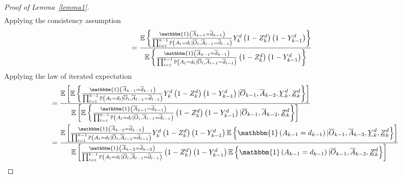 \documentclass[12pt]{article}
\begin{document}
\begin{proof}[Proof of Lemma~\ref{lemma1}]
\begin{align}
\end{align}
Applying the consistency assumption
\begin{align*}
&=\frac{\mathbb{E} \left\lbrace \frac{\mathbbm{1} \left( \overline{A}_{k-1} = \overline{d}_{k-1} \right)}{\prod_{l=1}^{k-1}  \mathbb{P} \left(A_l = d_l \vert \overline{O}_l, \overline{A}_{l-1} = \overline{d}_{l-1} \right)} Y_{k}^d \left(1-Z_{k}^d \right) \left(1-Y_{k-1}^d \right) \right\rbrace}{\mathbb{E} \left\lbrace \frac{\mathbbm{1} \left( \overline{A}_{k-1} = \overline{d}_{k-1} \right)}{\prod_{l=1}^{k-1}  \mathbb{P} \left(A_l = d_l \vert\overline{O}_l, \overline{A}_{l-1} = \overline{d}_{l-1} \right)} \left(1-Z_{k}^d \right) \left(1-Y_{k-1}^d \right) \right\rbrace}
\end{align*}
Applying the law of iterated expectation
\begin{align*}
&=\frac{\mathbb{E} \left[ \mathbb{E} \left\lbrace \frac{\mathbbm{1} \left( \overline{A}_{k-1} = \overline{d}_{k-1} \right)}{\prod_{l=1}^{k-1}  \mathbb{P} \left(A_l = d_l \vert \overline{O}_l, \overline{A}_{l-1} = \overline{d}_{l-1} \right)} Y_{k}^d \left(1-Z_{k}^d \right) \left(1-Y_{k-1}^d \right) \vert  \overline{O}_{k-1}, \overline{A}_{k-2}, \underline{Y}_{k}^d, \underline{Z}_{k}^d \right\rbrace \right]}{\mathbb{E} \left[ \mathbb{E} \left\lbrace \frac{\mathbbm{1} \left( \overline{A}_{k-1} = \overline{d}_{k-1} \right)}{\prod_{l=1}^{k-1}  \mathbb{P} \left(A_l = d_l \vert \overline{O}_l, \overline{A}_{l-1} = \overline{d}_{l-1} \right)} \left(1-Z_{k}^d \right) \left(1-Y_{k-1}^d \right) \vert  \overline{O}_{k-1}, \overline{A}_{k-2}, \underline{Z}_{k}^d \right\rbrace \right]} \\
&=\frac{\mathbb{E} \left[ \frac{\mathbbm{1} \left( \overline{A}_{k-2} = \overline{d}_{k-2} \right) }{\prod_{l=1}^{k-1}  \mathbb{P} \left(A_l = d_l \vert \overline{O}_l, \overline{A}_{l-1} = \overline{d}_{l-1} \right)} Y_{k}^d \left(1-Z_{k}^d \right) \left(1-Y_{k-1}^d \right) \mathbb{E} \left\lbrace \mathbbm{1} \left( A_{k-1} = d_{k-1} \right) \vert  \overline{O}_{k-1}, \overline{A}_{k-2}, \underline{Y}_{k}^d, \underline{Z}_{k}^d \right\rbrace \right]}{\mathbb{E} \left[ \frac{\mathbbm{1} \left( \overline{A}_{k-2} = \overline{d}_{k-2} \right)}{\prod_{l=1}^{k-1}  \mathbb{P} \left(A_l = d_l \vert \overline{O}_l, \overline{A}_{l-1} = \overline{d}_{l-1} \right)} \left(1-Z_{k}^d \right) \left(1-Y_{k-1}^d \right) \mathbb{E} \left\lbrace \mathbbm{1} \left( A_{k-1} = d_{k-1} \right) \vert  \overline{O}_{k-1}, \overline{A}_{k-2}, \underline{Z}_{k}^d \right\rbrace \right]} 
\end{align*}

\end{proof}
\end{document}
